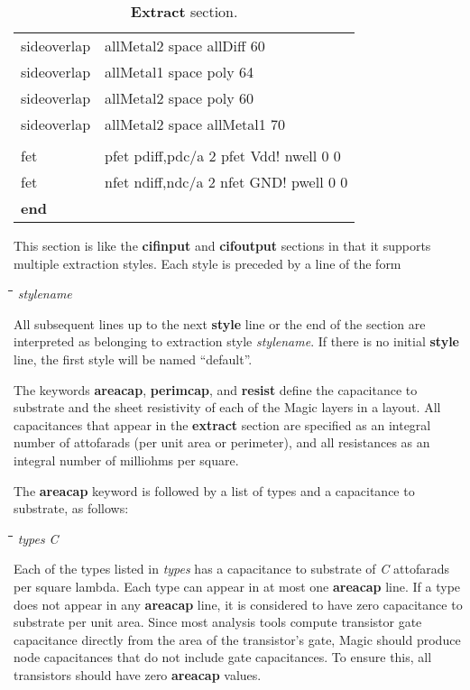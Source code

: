 \documentclass[letterpaper,twoside,12pt]{article}
\def\hinch{\hspace*{0.5in}}
\def\starti{\begin{center}\begin{tabbing}\hinch\=\hinch\=\hinch\=\hinch\=\kill}
\def\endi{\end{tabbing}\end{center}}
\def\ii{\>\>\>}
\def\vns{\vspace*{-0.05in}}
\begin{document}
\begin{table}[ht!p]
\begin{center}
\begin{tabular}{|ll|}
	sideoverlap &	allMetal2 space allDiff 60 \\
	sideoverlap &	allMetal1 space poly 64 \\
	sideoverlap &	allMetal2 space poly 60 \\
	sideoverlap &	allMetal2 space allMetal1 70 \\ \vns
	& \\
	fet	  &	pfet pdiff,pdc/a 2 pfet Vdd! nwell 0 0 \\
	fet	  &	nfet ndiff,ndc/a 2 nfet GND! pwell 0 0 \\
	{\bfseries end} & \\ \hline
      \end{tabular}
      \caption{{\bfseries Extract} section.}
      \label{extract}
   \end{center}
\end{table}

This section is like the {\bfseries cifinput} and {\bfseries cifoutput} sections
in that it supports multiple extraction styles.  Each style is
preceded by a line of the form

\starti
   \ii {\bfseries style} {\itshape stylename}
\endi

All subsequent lines up to the next {\bfseries style} line or the end
of the section are interpreted as belonging to extraction style
{\itshape stylename}.
If there is no initial {\bfseries style} line, the first
style will be named ``default''.

The keywords {\bfseries areacap}, {\bfseries perimcap},
and {\bfseries resist} define the capacitance to substrate
and the sheet resistivity of each of the Magic layers in a layout.
All capacitances that appear in the {\bfseries extract} section are
specified as an integral number of attofarads (per unit area or perimeter),
and all resistances as an integral number of milliohms per square.

The {\bfseries areacap} keyword is followed by a list of types
and a capacitance to substrate, as follows:

\starti
   \ii {\bfseries areacap} {\itshape types} {\itshape C}
\endi

Each of the types listed in {\itshape types} has a capacitance to substrate
of {\itshape C} attofarads per square lambda.
Each type can appear in at most one {\bfseries areacap} line.
If a type does not appear in any {\bfseries areacap} line,
it is considered to have zero
capacitance to substrate per unit area.
Since most analysis tools compute transistor gate capacitance directly
from the area of the transistor's gate, Magic should produce node
capacitances that do not include gate capacitances.  To ensure
this, all transistors should have zero {\bfseries areacap} values.
\end{document}
